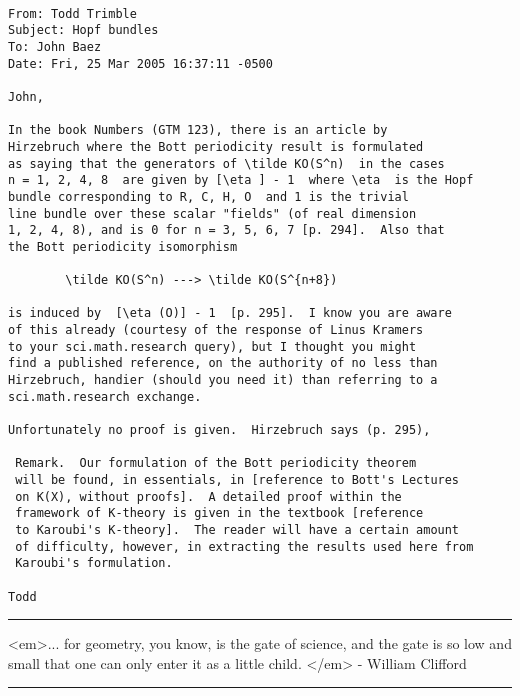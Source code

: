 \begin{verbatim}

From: Todd Trimble
Subject: Hopf bundles
To: John Baez 
Date: Fri, 25 Mar 2005 16:37:11 -0500

John, 

In the book Numbers (GTM 123), there is an article by 
Hirzebruch where the Bott periodicity result is formulated 
as saying that the generators of \tilde KO(S^n)  in the cases 
n = 1, 2, 4, 8  are given by [\eta ] - 1  where \eta  is the Hopf 
bundle corresponding to R, C, H, O  and 1 is the trivial 
line bundle over these scalar "fields" (of real dimension 
1, 2, 4, 8), and is 0 for n = 3, 5, 6, 7 [p. 294].  Also that 
the Bott periodicity isomorphism  

        \tilde KO(S^n) ---> \tilde KO(S^{n+8}) 

is induced by  [\eta (O)] - 1  [p. 295].  I know you are aware 
of this already (courtesy of the response of Linus Kramers 
to your sci.math.research query), but I thought you might 
find a published reference, on the authority of no less than 
Hirzebruch, handier (should you need it) than referring to a 
sci.math.research exchange. 

Unfortunately no proof is given.  Hirzebruch says (p. 295), 

 Remark.  Our formulation of the Bott periodicity theorem 
 will be found, in essentials, in [reference to Bott's Lectures 
 on K(X), without proofs].  A detailed proof within the 
 framework of K-theory is given in the textbook [reference 
 to Karoubi's K-theory].  The reader will have a certain amount 
 of difficulty, however, in extracting the results used here from 
 Karoubi's formulation.

Todd
\end{verbatim}
    



\par\noindent\rule{\textwidth}{0.4pt}
<em>... for geometry, you
know, is the gate of science,
and the gate is so low and small that one can only enter it as a little child.
</em> - William Clifford  
\par\noindent\rule{\textwidth}{0.4pt}

